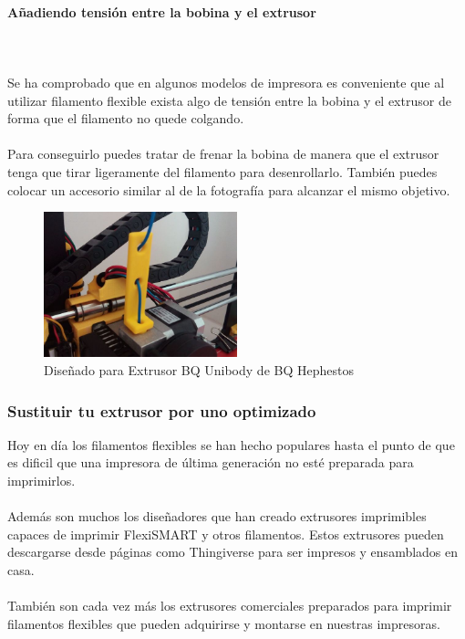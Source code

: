 \documentclass[11pt,a4paper]{article}
\begin{document}
			\paragraph{Añadiendo tensión entre la bobina y el extrusor}\mbox{}\\\\
Se ha comprobado que en algunos modelos de impresora es conveniente que al utilizar filamento flexible exista algo de tensión entre la bobina y el extrusor de forma que el filamento no quede colgando.
\\\\
Para conseguirlo puedes tratar de frenar la bobina de manera que el extrusor tenga que tirar ligeramente del filamento para desenrollarlo. También puedes colocar un accesorio similar al de la fotografía para alcanzar el mismo objetivo.
\begin{figure}[H]
\centering
\includegraphics[width=0.5\textwidth,cfbox=azul_marcos 4pt 0pt]{FOTOS/SOLUCION2}
\caption*{Diseñado para Extrusor BQ Unibody de BQ Hephestos}
\end{figure}
		\subsubsection{Sustituir tu extrusor por uno optimizado}
Hoy en día los filamentos flexibles se han hecho populares hasta el punto de que es dificil que una impresora de última generación no esté preparada para imprimirlos.
\\\\
Además son muchos los diseñadores que han creado extrusores imprimibles capaces de imprimir FlexiSMART y otros filamentos. Estos extrusores pueden descargarse desde páginas como Thingiverse para ser impresos y ensamblados en casa.
\\\\
También son cada vez más los extrusores comerciales preparados para imprimir filamentos flexibles que pueden adquirirse y montarse en nuestras impresoras.
\end{document}
